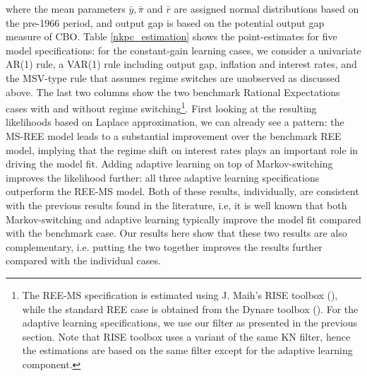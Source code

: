 \documentclass[12pt,reqno]{article}
\numberwithin{equation}{section}
\begin{document}
where the mean parameters $\bar{y}, \bar{\pi} $ and $\bar{r}$ are assigned normal distributions based on the pre-1966 period, and output gap is based on the potential output gap measure of CBO.  Table \ref{nkpc_estimation} shows the point-estimates for five model specifications: for the constant-gain learning cases, we consider a univariate AR(1) rule, a VAR(1) rule including output gap, inflation and interest rates, and the MSV-type rule that assumes regime switches are unobserved as discussed above. The last two columns show the two benchmark Rational Expectations cases with and without regime switching\footnote{The REE-MS specification is estimated using J. Maih's RISE toolbox (\cite{maih2015efficient}), while the standard REE case is obtained from the Dynare toolbox (\cite{adjemian2011dynare}). For the adaptive learning specifications, we use our filter as presented in the previous section. Note that RISE toolbox uses a variant of the same KN filter, hence the estimations are based on the same filter except for the adaptive learning component.}. First looking at the resulting likelihoods based on Laplace approximation, we can already see a pattern: the MS-REE model leads to a substantial improvement over the benchmark REE model, implying that the regime shift on interest rates plays an important role in driving the model fit. Adding adaptive learning on top of Markov-switching improves the likelihood further: all three adaptive learning specifications outperform the REE-MS model. Both of these results, individually, are consistent with the previous results found in the literature, i.e, it is well known that both Markov-switching and adaptive learning typically improve the model fit compared with the benchmark case. Our results here show that these two results are also complementary, i.e. putting the two together improves the results further compared with the individual cases.\\
\end{document}
